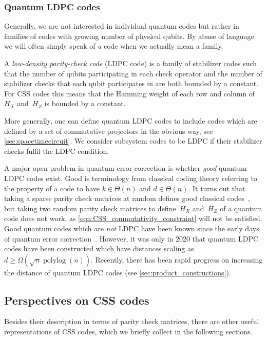 \documentclass[amsmath, amssymb, floatfix, reprint, twocolumn, notitlepage, 10pt]{revtex4-1}
\newcommand{\polylog}{\operatorname{polylog}}
\begin{document}
\subsubsection{Quantum LDPC  codes}\label{sec:LDPC_definition}
Generally, we are not interested in individual quantum codes but rather in families of codes with growing number of physical qubits.
By abuse of language we will often simply speak of \emph{a} code when we actually mean a family. 

A \emph{low-density parity-check code} (LDPC code) is a family of stabilizer codes such that the number of qubits participating in each check operator and the number of stabilizer checks that each qubit participates in are both bounded by a constant.
For CSS codes this means that the Hamming weight of each row and column of~$H_X$ and~$H_Z$ is bounded by a constant.

More generally, one can define quantum LDPC codes to include codes which are defined by a set of commutative projectors in the obvious way, see \cref{sec:spacetimecircuit}.
We consider subsystem codes to be LDPC if their stabilizer checks fulfil the LDPC condition.

A major open problem in quantum error correction is whether \emph{good} quantum LDPC codes exist.
Good is terminology from classical coding theory referring to the property of a code to have $k \in \Theta(n)$ and $d\in \Theta(n)$.
It turns out that taking a sparse parity check matrices at random defines good classical codes~\cite{richardson2008modern}, but taking two random  parity check matrices to define~$H_X$ and~$H_Z$ of a quantum code does not work, as \cref{eqn:CSS_commutativity_constraint} will not be satisfied.
Good quantum codes which are \emph{not} LDPC have been known since the early days of quantum error correction~\cite{calderbank1996good,ashikhmin2001asymptotically}.
However, it was only in 2020 that quantum LDPC codes have been constructed which have distances scaling as $d \geq \Omega(\sqrt{n} \polylog(n))$.
Recently, there has been rapid progress on increasing the distance of quantum LDPC codes (see \cref{sec:product_constructions}).


\subsection{Perspectives on CSS codes}
Besides their description in terms of parity check matrices, there are other useful representations of CSS codes, which we briefly collect in the following sections.
\end{document}
